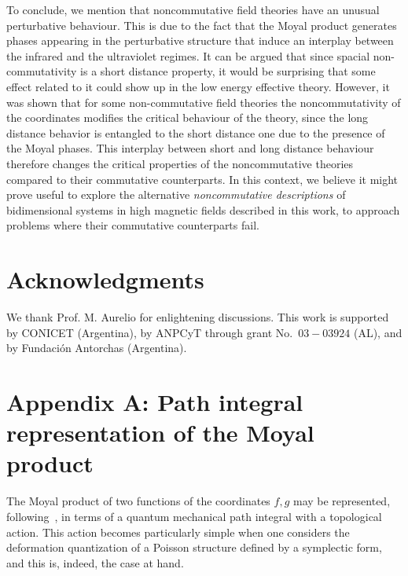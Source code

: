 \documentclass[a4paper,12pt]{article}
\begin{document}
To conclude, we mention that noncommutative field theories have an
unusual perturbative behaviour. This is due to the fact that the
Moyal
product generates phases appearing in the perturbative structure
that
induce an interplay between the infrared and the ultraviolet
regimes.
It can be argued that since spacial non-commutativity is a short
distance property, it would be surprising that some effect related
to
it could show up in the low energy effective theory. However, it
was
shown that for some non-commutative field theories
\cite{MST,cri1,cri2} the noncommutativity of the coordinates
modifies
the critical behaviour of the theory, since the long distance
behavior
is entangled to the short distance one due to the presence of the
Moyal phases. This interplay between short and long distance
behaviour
therefore changes the critical properties of the noncommutative
theories compared to their commutative counterparts. In this
context,
we believe it might prove useful to explore the alternative {\it
  noncommutative descriptions\/} of bidimensional systems in high
magnetic fields described in this work, to approach problems where
their commutative counterparts fail.





\section*{Acknowledgments}
We thank Prof. M. Aurelio for enlightening discussions.  This work
is
supported by CONICET (Argentina), by ANPCyT through grant No.\ 
$03-03924$ (AL), and by Fundaci{\'o}n Antorchas (Argentina).

\section*{Appendix A: Path integral representation of 
  the Moyal product} The Moyal product of two functions of the
coordinates $f, g$ may be represented, following~\cite{cattaneo},
in
terms of a quantum mechanical path integral with a topological
action.
This action becomes particularly simple when one considers the
deformation quantization of a Poisson structure defined by a
symplectic form, and this is, indeed, the case at hand.
\end{document}
